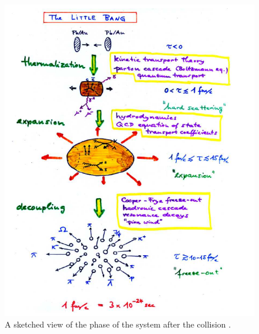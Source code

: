 \documentclass[12pt,a4paper]{book}
\begin{document}
	\begin{figure}[ht]
		\centering
		\includegraphics[width=0.7\linewidth]{pictures/collision_stage.png}
		\caption{A sketched view of the phase of the system after the collision  \cite{heinz2004conceptsheavyionphysics}.}
		\label{fig::collision_stage} 
	\end{figure}
	\FloatBarrier
\end{document}
